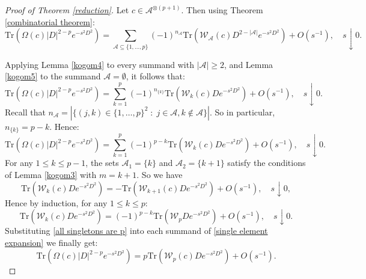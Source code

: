     \begin{proof}[Proof of Theorem \ref{reduction}] 
        Let $c  \in \mathcal{A}^{\otimes (p+1)}$. Then using Theorem \ref{combinatorial theorem}:
        \begin{equation*}
            \mathrm{Tr}(\Omega(c)|D|^{2-p}e^{-s^2D^2}) = \sum_{\mathscr{A} \subseteq \{1,\ldots,p\}}(-1)^{n_{\mathscr{A}}}\mathrm{Tr}(\mathcal{W}_{\mathscr{A}}(c)D^{2-|\mathscr{A}|}e^{-s^2D^2})+O(s^{-1}),\quad s\downarrow 0.
        \end{equation*}
        
        Applying Lemma \ref{kogom4} to every summand with $|\mathscr{A}| \geq 2$, and Lemma \ref{kogom5} to the summand $\mathscr{A} = \emptyset$, it follows that:
        \begin{equation*}
            \mathrm{Tr}(\Omega(c)|D|^{2-p}e^{-s^2D^2}) = \sum_{k=1}^p (-1)^{n_{\{k\}}} \mathrm{Tr}(\mathcal{W}_k(c)De^{-s^2D^2})+O(s^{-1}),\quad s\downarrow 0.
        \end{equation*}
        Recall that $n_{\mathscr{A}} = |\{(j,k)\in \{1,\ldots,p\}^2\;:\;j \in \mathscr{A}, k\notin \mathscr{A}\}|$.
        So in particular, $n_{\{k\}} = p-k$. Hence:
        \begin{equation}\label{single element expansion}
            \mathrm{Tr}(\Omega(c)|D|^{2-p}e^{-s^2D^2}) = \sum_{k=1}^p (-1)^{p-k}\mathrm{Tr}(\mathcal{W}_{k}(c)De^{-s^2D^2})+O(s^{-1}),\quad s\downarrow 0.
        \end{equation}
        For any $1 \leq k \leq p-1$, the sets $\mathscr{A}_1 = \{k\}$ and $\mathscr{A}_2 = \{k+1\}$ satisfy the conditions of Lemma \ref{kogom3} with $m = k+1$. So we have
        \begin{equation*}
            \mathrm{Tr}(\mathcal{W}_k(c)De^{-s^2D^2}) = -\mathrm{Tr}(\mathcal{W}_{k+1}(c)De^{-s^2D^2}) + O(s^{-1}),\quad s\downarrow0,
        \end{equation*}
        Hence by induction, for any $1 \leq k \leq p$:
        \begin{equation}\label{all singletons are p}
            \mathrm{Tr}(\mathcal{W}_k(c)De^{-s^2D^2}) = (-1)^{p-k}\mathrm{Tr}(\mathcal{W}_{p}De^{-s^2D^2}) + O(s^{-1}),\quad s\downarrow 0.
        \end{equation}        
        Substituting \eqref{all singletons are p} into each summand of \eqref{single element expansion} we finally get:
        \begin{equation*}
            \mathrm{Tr}(\Omega(c)|D|^{2-p}e^{-s^2D^2}) = p\mathrm{Tr}(\mathcal{W}_p(c)De^{-s^2D^2})+O(s^{-1}).
        \end{equation*}
    \end{proof}

